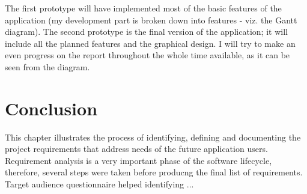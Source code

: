The first prototype will have implemented most of the basic features of the application (my development part is broken down into features - viz. the Gantt diagram). The second prototype is the final version of the application; it will include all the planned features and the graphical design. I will try to make an even progress on the report throughout the whole time available, as it can be seen from the diagram.


\section{Conclusion}
\label{conclusion_req}
This chapter illustrates the process of identifying, defining and documenting the project requirements that address needs of the future application users. Requirement analysis is a very important phase of the software lifecycle, therefore, several steps were taken before producng the final list of requirements. Target audience questionnaire helped identifying ... 
